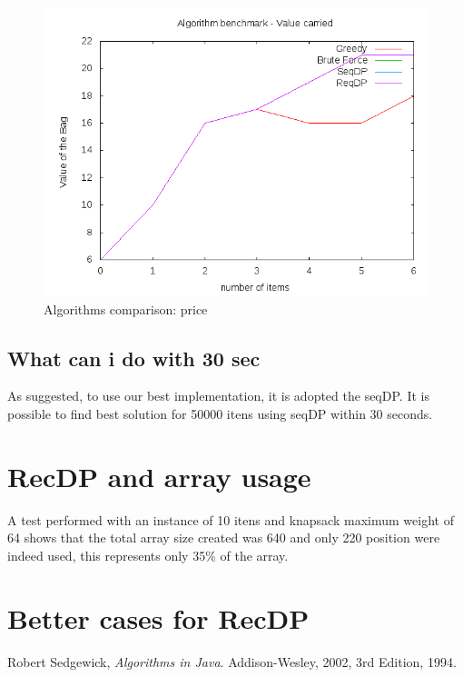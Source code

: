 \documentclass{article}
\begin{document}
\begin{figure}
\includegraphics[scale=0.4]{report/price_analysis}
\caption{Algorithms comparison: price}
\label{report/price_analysis}
\end{figure}

\subsection{What can i do with 30 sec}

As suggested, to use our best implementation, it is adopted the seqDP. It is possible to find best solution for 50000 itens 
using seqDP within 30 seconds.

\section{RecDP and array usage}

A test performed with an instance of 10 itens and knapsack maximum weight of 64 shows that the total array size created was
640 and only 220 position were indeed used, this represents only 35\% of the array.

\section{Better cases for RecDP}
	
\begin{thebibliography}{9}

  Robert Sedgewick,
  \emph{Algorithms in Java}.
  Addison-Wesley, 2002,
  3rd Edition,
  1994.

\end{thebibliography}
\end{document}
